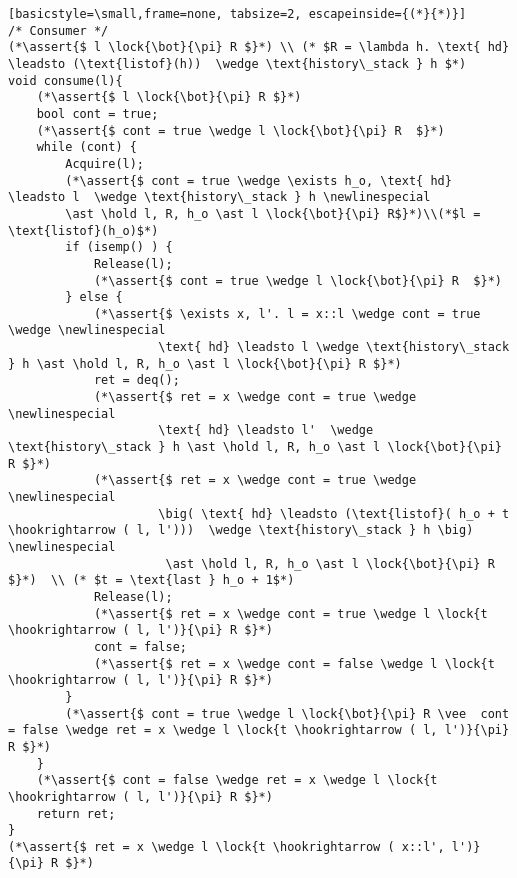 \documentclass[8pt]{article}
\newcommand{\lock}[2]{ \square \hspace{-1ex} \xrightarrow[#1]{#2}}
\newcommand{\hold}{\text{Hold }}
\newcommand{\assert}[1]{\textcolor{blue}{ \{ #1 \}  } }
\newcommand{\newlinespecial}{\newline \hphantom{100pt}}
\begin{document}
\begin{lstlisting}[basicstyle=\small,frame=none, tabsize=2, escapeinside={(*}{*)}]
/* Consumer */
(*\assert{$ l \lock{\bot}{\pi} R $}*) \\ (* $R = \lambda h. \text{ hd} \leadsto (\text{listof}(h))  \wedge \text{history\_stack } h $*)
void consume(l){
	(*\assert{$ l \lock{\bot}{\pi} R $}*)
	bool cont = true;
	(*\assert{$ cont = true \wedge l \lock{\bot}{\pi} R  $}*)
	while (cont) {
		Acquire(l);
		(*\assert{$ cont = true \wedge \exists h_o, \text{ hd} \leadsto l  \wedge \text{history\_stack } h \newlinespecial
		\ast \hold l, R, h_o \ast l \lock{\bot}{\pi} R$}*)\\(*$l = \text{listof}(h_o)$*)
		if (isemp() ) {
			Release(l);
			(*\assert{$ cont = true \wedge l \lock{\bot}{\pi} R  $}*)	
		} else {
			(*\assert{$ \exists x, l'. l = x::l \wedge cont = true \wedge \newlinespecial
					 \text{ hd} \leadsto l \wedge \text{history\_stack } h \ast \hold l, R, h_o \ast l \lock{\bot}{\pi} R $}*)
			ret = deq();
			(*\assert{$ ret = x \wedge cont = true \wedge \newlinespecial
					 \text{ hd} \leadsto l'  \wedge \text{history\_stack } h \ast \hold l, R, h_o \ast l \lock{\bot}{\pi} R $}*)
			(*\assert{$ ret = x \wedge cont = true \wedge \newlinespecial
					 \big( \text{ hd} \leadsto (\text{listof}( h_o + t \hookrightarrow ( l, l')))  \wedge \text{history\_stack } h \big) \newlinespecial
					  \ast \hold l, R, h_o \ast l \lock{\bot}{\pi} R $}*)  \\ (* $t = \text{last } h_o + 1$*)
			Release(l);
			(*\assert{$ ret = x \wedge cont = true \wedge l \lock{t \hookrightarrow ( l, l')}{\pi} R $}*)
			cont = false;
			(*\assert{$ ret = x \wedge cont = false \wedge l \lock{t \hookrightarrow ( l, l')}{\pi} R $}*)
		}
		(*\assert{$ cont = true \wedge l \lock{\bot}{\pi} R \vee  cont = false \wedge ret = x \wedge l \lock{t \hookrightarrow ( l, l')}{\pi} R $}*)	
	}
	(*\assert{$ cont = false \wedge ret = x \wedge l \lock{t \hookrightarrow ( l, l')}{\pi} R $}*)		
	return ret;
}
(*\assert{$ ret = x \wedge l \lock{t \hookrightarrow ( x::l', l')}{\pi} R $}*)


\end{lstlisting}
\end{document}
